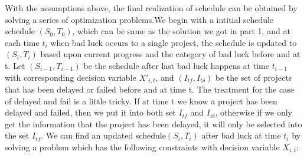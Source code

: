 \documentclass[final,3p,times]{elsarticle}
\begin{document}
With the assumptions above, the final realization of schedule can be obtained by solving a series of optimization problems.We begin with a intitial schedule schedule $(S_0,T_0)$, which can be same as the solution we got in part 1, and at each time $t_i$ when bad luck occurs to a single project, the schedule is updated to $(S_i, T_i)$ based upon current progress and the category of bad luck before and at t. Let $(S_{i-1},T_{i-1})$ be the schedule after last bad luck happens at time $t_{i-1}$ with corresponding decision variable $X'_{i,t}$, and $(I_{tf}, I_{t\delta})$ be the set of projects that has been delayed or failed before and at time t. The treatment for the case of delayed and fail is a little tricky. If at time t we know a project has been delayed and failed, then we put it into both set $I_{tf}$ and $I_{t\delta}$, otherwise if we only get the information that the project has been delayed, it will only be selected into the set $I_{tf}$. We can find an updated schedule$(S_{i},T_{i})$ after bad luck at time $t_i$ by solving a problem which has the following constraints with decision variable $X_{i,t}$:
\end{document}
